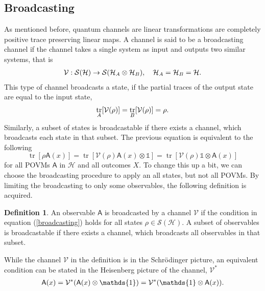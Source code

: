 \documentclass[a4paper,12pt]{wihuri}
\theoremstyle{definition}
\newtheorem{definition}{Definition}
\numberwithin{definition}{section}
\numberwithin{example}{section}
\numberwithin{theorem}{section}
\numberwithin{proposition}{section}
\numberwithin{lemma}{section}
\newcommand{\hi}{\mathcal{H}}%
\newcommand{\tila}{\mathcal{S}}%
\newcommand{\V}{\mathcal{V}}%
\newcommand{\A}{\mathsf{A}}%
\newcommand{\id}{\mathds{1}}
\DeclareMathOperator{\tr}{tr}
\begin{document}
\subsection{Broadcasting}
As mentioned before, quantum channels are linear transformations are completely positive trace preserving linear maps. A channel is said to be a broadcasting channel if the channel takes a single system as input and outputs two similar systems\cite{heinosaari_simultaneous}, that is
\begin{align*}
\V: \tila(\hi) \rightarrow \tila(\hi_A \otimes\hi_B), \quad \hi_A = \hi_B = \hi \text.
\end{align*}
This type of channel broadcasts a state, if the partial traces of the output state are equal to the input state, 
\begin{align*}
\tr_A[\V(\rho)] = \tr_B[\V(\rho)] = \rho \text.
\end{align*}
Similarly, a subset of states is broadcastable if there exists a channel, which broadcasts each state in that subset. The previous equation is equivalent to the following\cite{heinosaari_simultaneous}
\begin{equation}\label{broadcasting}
\tr[\rho\A(x)] = \tr[\V(\rho)\A(x)\otimes\id] = \tr[\V(\rho)\id\otimes\A(x)]
\end{equation}
for all POVMs $\A$ in $\hi$ and all outcomes $X$. To change this up a bit, we can choose the broadcasting procedure to apply an all states, but not all POVMs. By limiting the broadcasting to only some observables, the following definition is acquired.

\begin{definition}
An observable $\A$ is broadcasted by a channel $\V$ if the condition in equation (\ref{broadcasting}) holds for all states $\rho \in \tila(\hi)$. A subset of observables is broadcastable if there exists a channel, which broadcasts all observables in that subset.
\end{definition}
While the channel $\V$ in the definition is in the Schrödinger picture, an equivalent condition can be stated in the Heisenberg picture of the channel, $\V^*$
\begin{align*}
\A(x) = \V^*(\A(x)\otimes\id) = \V^*(\id\otimes\A(x))\text.
\end{align*}

\end{document}

